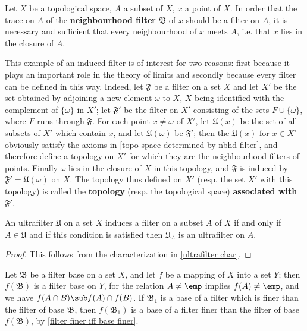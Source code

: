 \begin{example}
Let $X$ be a topological space, $A$ a subset of $X$, $x$ a point of $X$. In order that the trace on $A$ of the \textbf{neighbourhood filter} $\mathfrak{B}$ of $x$ should be a filter on $A$, it is necessary and sufficient that every neighbourhood of $x$ meets $A$, i.e. that $x$ lies in the closure of $A$.\par
This example of an induced filter is of interest for two reasons: first because it plays an important role in the theory of limits and secondly because every filter can be defined in this way. Indeed, let $\mathfrak{F}$ be a filter on a set $X$ and let $X'$ be the set obtained by adjoining a new element $\omega$ to $X$, $X$ being identified with the complement of $\{\omega\}$ in $X'$; let $\mathfrak{F}'$ be the filter on $X'$ consisting of the sets $F\cup\{\omega\}$, where $F$ runs through $\mathfrak{F}$. For each point $x\neq\omega$ of $X'$, let $\mathfrak{U}(x)$ be the set of all subsets of $X'$ which contain $x$, and let $\mathfrak{U}(\omega)$ be $\mathfrak{F}'$; then the $\mathfrak{U}(x)$ for $x\in X'$ obviously satisfy the axioms in \cref{topo space determined by nbhd filter}, and therefore define a topology on $X'$ for which they are the neighbourhood filters of points. Finally $\omega$ lies in the closure of $X$ in this topology, and $\mathfrak{F}$ is induced by $\mathfrak{F}'=\mathfrak{U}(\omega)$ on $X$. The topology thus defined on $X'$ (resp. the set $X'$ with this topology) is called the \textbf{topology} (resp. the topological space) \textbf{associated with $\mathfrak{F}'$}.
\end{example}
\begin{proposition}
An ultrafilter $\mathfrak{U}$ on a set $X$ induces a filter on a subset $A$ of $X$ if and only if $A\in\mathfrak{U}$ and if this condition is satisfied then $\mathfrak{U}_A$ is an ultrafilter on $A$.
\end{proposition}
\begin{proof}
This follows from the characterization in \cref{ultrafilter char}.
\end{proof}
Let $\mathfrak{B}$ be a filter base on a set $X$, and let $f$ be a mapping of $X$ into a set $Y$; then $f(\mathfrak{B})$ is a filter base on $Y$, for the relation $A\neq\emp$ implies $f(A)\neq\emp$, and we have $f(A\cap B)\sub f(A)\cap f(B)$. If $\mathfrak{B}_1$ is a base of a filter which is finer than the filter of base $\mathfrak{B}$, then $f(\mathfrak{B}_1)$ is a base of a filter finer than the filter of base $f(\mathfrak{B})$, by \cref{filter finer iff base finer}.

